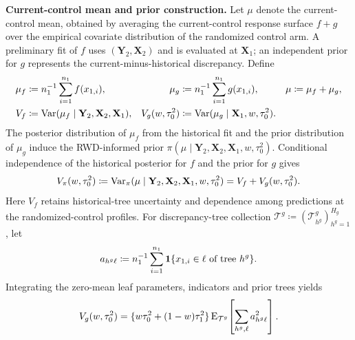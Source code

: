 \documentclass[11pt]{article}
\begin{document}
\noindent\textbf{Current-control mean and prior construction.}
Let $\mu$ denote the current-control mean, obtained by averaging the current-control response surface $f+g$ over the empirical covariate distribution of the randomized control arm. A preliminary fit of $f$ uses $(\mathbf Y_{2},\mathbf X_{2})$ and is evaluated at $\mathbf X_{1}$; an independent prior for $g$ represents the current-minus-historical discrepancy. Define
\begin{equation}\label{eq:varianceparts}
\begin{aligned}
\mu_f&\coloneqq n_{1}^{-1}\sum_{i=1}^{n_{1}}f(x_{1,i}),&
\mu_g&\coloneqq n_{1}^{-1}\sum_{i=1}^{n_{1}}g(x_{1,i}),&
\mu&\coloneqq\mu_f+\mu_g,\\
V_f&\coloneqq \operatorname{Var}(\mu_f\mid\mathbf Y_{2},\mathbf X_{2},\mathbf X_{1}),&
V_g(w,\tau_0^2)&\coloneqq\operatorname{Var}(\mu_g\mid\mathbf X_{1},w,\tau_0^2).
\end{aligned}
\end{equation}
The posterior distribution of $\mu_f$ from the historical fit and the prior distribution of $\mu_g$ induce the RWD-informed prior
$\pi(\mu\mid\mathbf Y_{2},\mathbf X_{2},\mathbf X_{1},w,\tau_0^2)$.
Conditional independence of the historical posterior for $f$ and the prior for $g$ gives
\begin{equation}\label{eq:targetvariance}
V_{\pi}(w,\tau_0^2)
\coloneqq\operatorname{Var}_{\pi}(\mu\mid\mathbf Y_{2},\mathbf X_{2},\mathbf X_{1},w,\tau_0^2)
=V_f+V_g(w,\tau_0^2).
\end{equation}
Here $V_f$ retains historical-tree uncertainty and dependence among predictions at the randomized-control profiles. For discrepancy-tree collection
$\mathcal T^g\coloneqq(\mathcal T_{h^g}^g)_{h^g=1}^{H_g}$, let
\[
a_{h^g\ell}\coloneqq n_{1}^{-1}\sum_{i=1}^{n_{1}}
\mathbf{1}\{x_{1,i}\in\ell\text{ of tree }h^g\}.
\]
Integrating the zero-mean leaf parameters, indicators and prior trees yields
\begin{equation}\label{eq:Vgmain}
V_g(w,\tau_0^2)
=\{w\tau_0^2+(1-w)\tau_1^2\}
\operatorname{E}_{\mathcal T^g}\!\left[\sum_{h^g,\ell}a_{h^g\ell}^2\right].
\end{equation}
\end{document}
